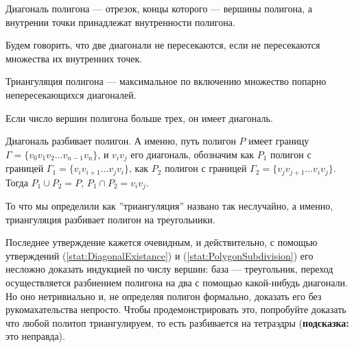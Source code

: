 \begin{definition}
    Диагональ полигона --- отрезок, концы которого --- вершины полигона, а внутрении точки принадлежат внутренности полигона. 
\end{definition}
Будем говорить, что две диагонали не пересекаются, если не пересекаются множества их внутренних точек.
\begin{definition}
    Триангуляция полигона --- максимальное по включению множество попарно непересекающихся диагоналей.
\end{definition}
\begin{statement}
    \label{stat:DiagonalExistance}
    Если число вершин полигона больше трех, он имеет диагональ.
\end{statement}
\begin{statement}
    \label{stat:PolygonSubdivision}
    Диагональ разбивает полигон. А именно, путь полигон $P$ имеет границу $\Gamma = \{v_0 v_1 v_2 ... v_{n-1} v_n \}$, 
    и $v_i v_j$ его диагональ, обозначим как $P_1$ полигон с границей $\Gamma_1 = \{v_i v_{i+1} ... v_j v_i \}$, 
    как $P_2$ полигон с границей $\Gamma_2 = \{v_j v_{j+1} ... v_i v_j \}$. Тогда $P_1 \cup P_2 = P$, $P_1 \cap P_2 = v_i v_j$.
\end{statement}
\begin{statement}
    То что мы определили как ''триангуляция'' названо так неслучайно, а именно, триангуляция разбивает полигон на треугольники.
\end{statement}
Последнее утверждение кажется очевидным, и действительно, с помощью утверждений (\ref{stat:DiagonalExistance}) и 
(\ref{stat:PolygonSubdivision}) его несложно доказать индукцией по числу вершин: база --- треугольник, 
переход осуществляется разбиением полигона на два с помощью какой-нибудь диагонали.
Но оно нетривиально и, не определяя полигон формально, доказать его без рукомахательства непросто. Чтобы продемонстрировать это,
попробуйте доказать что любой политоп триангулируем, то есть разбивается на тетраэдры (\textbf{подсказка: } это неправда).

